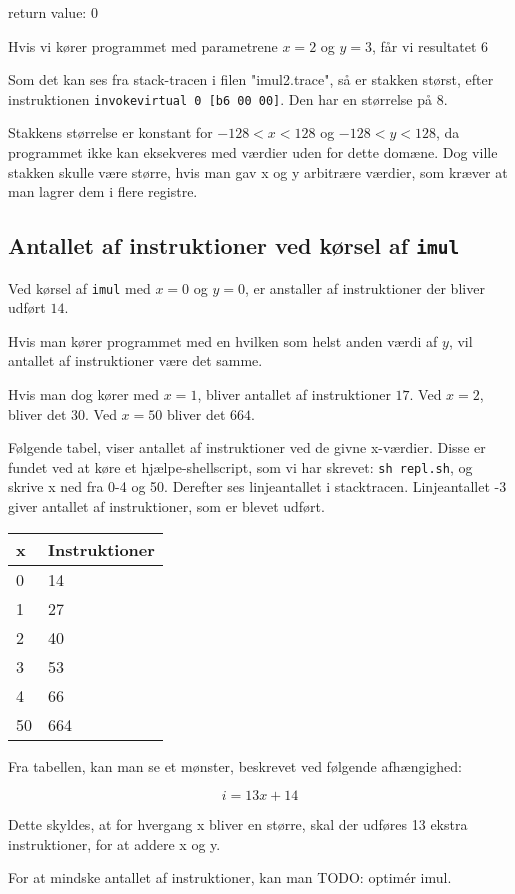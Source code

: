 \documentclass[12pt,a4paper]{article}
\newcommand{\imul}{\texttt{imul}}
\begin{document}
return value: $0$


Hvis vi kører programmet med parametrene $x=2$ og $y=3$, får vi resultatet $6$

Som det kan ses fra stack-tracen i filen "imul2.trace", så er stakken størst, efter instruktionen \texttt{invokevirtual 0 [b6 00 00]}. Den har en størrelse på $8$.

Stakkens størrelse er konstant for $-128 < x < 128$ og $-128 < y < 128$, da programmet ikke kan eksekveres med værdier uden for dette domæne. Dog ville stakken skulle være større, hvis man gav x og y arbitrære værdier, som kræver at man lagrer dem i flere registre.

\subsection{Antallet af instruktioner ved kørsel af \imul{}}
Ved kørsel af \imul{} med $x=0$ og $y=0$, er anstaller af instruktioner der bliver udført $14$.

Hvis man kører programmet med en hvilken som helst anden værdi af $y$, vil antallet af instruktioner være det samme.

Hvis man dog kører med $x=1$, bliver antallet af instruktioner $17$. Ved $x=2$, bliver det $30$. Ved $x=50$ bliver det $664$.

Følgende tabel, viser antallet af instruktioner ved de givne x-værdier. Disse er fundet ved at køre et hjælpe-shellscript, som vi har skrevet: \texttt{sh repl.sh}, og skrive x ned fra 0-4 og 50. Derefter ses linjeantallet i stacktracen. Linjeantallet -3 giver antallet af instruktioner, som er blevet udført.

\begin{tabular}{|l|l|}
\hline
x  & Instruktioner \\ \hline
0  & 14  \\ \hline
1  & 27  \\ \hline
2  & 40  \\ \hline
3  & 53  \\ \hline
4  & 66  \\ \hline
50 & 664 \\ \hline

\end{tabular}

Fra tabellen, kan man se et mønster, beskrevet ved følgende afhængighed:

\[
	i = 13x + 14
\]

Dette skyldes, at for hvergang x bliver en større, skal der udføres 13 ekstra instruktioner, for at addere x og y.

For at mindske antallet af instruktioner, kan man TODO: optimér imul.
\end{document}
